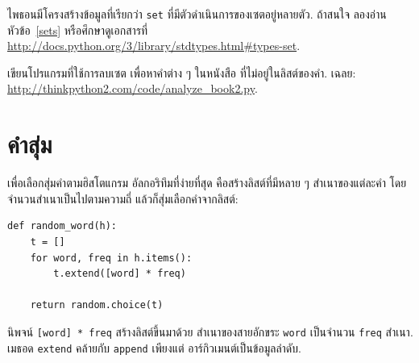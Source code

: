 \begin{exercise}


ไพธอนมีโครงสร้างข้อมูลที่เรียกว่า \texttt{set} ที่มีตัวดำเนินการของเซตอยู่หลายตัว.
ถ้าสนใจ ลองอ่านหัวข้อ~\ref{sets} หรือศึกษาดูเอกสารที่
\url{http://docs.python.org/3/library/stdtypes.html#types-set}.


เขียนโปรแกรมที่ใช้การลบเซต เพื่อหาคำต่าง ๆ ในหนังสือ ที่ไม่อยู่ในลิสต์ของคำ.
เฉลย: \url{http://thinkpython2.com/code/analyze_book2.py}.

\end{exercise}


\section{คำสุ่ม}
\label{randomwords}


เพื่อเลือกสุ่มคำตามฮิสโตแกรม
อัลกอริทึมที่ง่ายที่สุด คือสร้างลิสต์ที่มีหลาย ๆ สำเนาของแต่ละคำ 
โดยจำนวนสำเนาเป็นไปตามความถี่ แล้วก็สุ่มเลือกคำจากลิสต์:

\begin{verbatim}
def random_word(h):
    t = []
    for word, freq in h.items():
        t.extend([word] * freq)

    return random.choice(t)
\end{verbatim}
%
%
นิพจน์ \texttt{[word] * freq} สร้างลิสต์ขึ้นมาด้วย
สำเนาของสายอักขระ \texttt{word} 
เป็นจำนวน \texttt{freq} สำเนา.
เมธอด \texttt{extend} คล้ายกับ \texttt{append} 
เพียงแต่ อาร์กิวเมนต์เป็นข้อมูลลำดับ.

